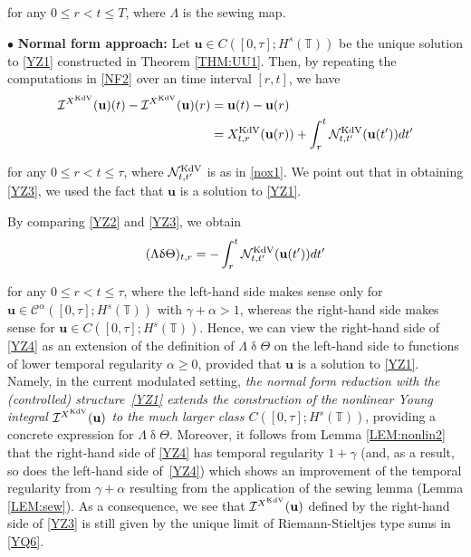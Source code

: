 \documentclass[letterpaper, 11pt,  reqno]{amsart}
\newcommand{\1}{\hspace{0.5mm}\text{I}\hspace{0.5mm}}
\newcommand{\I}{\mathcal{I}}
\newcommand{\noi}{\noindent}
\newcommand{\T}{\mathbb{T}}
\newcommand{\bul}{\bullet}
\newcommand{\CC}{\mathcal{C}}
\newcommand{\al}{\alpha}
\newcommand{\updl}{\updelta}
\newcommand{\g}{\gamma}
\newcommand{\Ld}{\Lambda}
\newcommand{\NN}{\mathcal{N}}
\newcommand{\uu}{\mathbf{u}}
\newcommand{\Ta}{\Theta}
\newcommand{\KDV}{\text{\rm KdV} }
\numberwithin{equation}{section}
\numberwithin{theorem}{section}
\begin{document}
\noi
for any $0 \le r < t \le T$, 
where $\Ld$ is the sewing map.




\medskip

\noi
$\bul$ {\bf Normal form approach:}
Let $\uu \in C([0, \tau]; H^s(\T))$
be the unique solution to \eqref{YZ1}
constructed in Theorem \ref{THM:UU1}.
Then, by repeating the computations in \eqref{NF2}
over an time interval $[r, t]$, 
we have
\begin{align}
\begin{split}
\I^{X^\KDV}(\uu)(t) - \I^{X^\KDV}(\uu)(r)
& = \uu(t) - \uu(r) \\
&  =  
 X^\KDV_{t, r}(\uu (r) )
+ 
\int_r^t 
\NN^\KDV_{t, t'}(\uu(t'))dt'
\end{split}
\label{YZ3}
\end{align}

\noi
for any $0 \le r < t \le \tau$, 
where $\NN^\KDV_{t, t'}$ is as in \eqref{nox1}.
We point out that in obtaining \eqref{YZ3}, 
we used the fact that $\uu$ is a solution to \eqref{YZ1}.


\medskip

By comparing \eqref{YZ2} and \eqref{YZ3}, 
we obtain 
\begin{align}
  (\Ld \updl \Ta)_{t, r}
 = 
- \int_r^t 
\NN^\KDV_{t, t'}(\uu(t'))dt'
\label{YZ4}
\end{align}




\noi
for any $0 \le r < t \le \tau$, 
where
the left-hand side makes sense
only for  $\uu\in \CC^{\al}([0,\tau];H^s(\T))$
with $\g + \al > 1$, 
whereas 
the right-hand side makes sense
for  $\uu\in C([0,\tau];H^s(\T))$.
Hence, we can view 
the right-hand side
of \eqref{YZ4}
as an extension of 
the definition of 
$\Ld \updl \Ta$ on the left-hand side
to functions of lower temporal regularity $\al \ge 0$, 
provided that $\uu$ is a solution to \eqref{YZ1}.
Namely, 
in the current modulated setting, 
{\it the normal form reduction
with the (controlled) structure~\eqref{YZ1}
extends 
the construction of the nonlinear Young integral
$\I^{X^\KDV}(\uu)$ 
to the much larger class 
$C([0,\tau];H^s(\T))$}, 
providing a concrete expression for $\Ld \updl \Ta$.
Moreover, it follows from Lemma \ref{LEM:nonlin2}
that the right-hand side of \eqref{YZ4}
has temporal regularity $1 + \g$
(and, as a result,  so does the left-hand side of~\eqref{YZ4})
which shows an improvement of the temporal regularity
from $\g + \al$ resulting from the application of the sewing lemma (Lemma \ref{LEM:sew}).
As a consequence, 
we see that  
$\I^{X^\KDV}(\uu)$ defined by the right-hand side of \eqref{YZ3}
is still given by the 
 unique limit of 
Riemann-Stieltjes type sums in \eqref{YQ6}.
\end{document}
